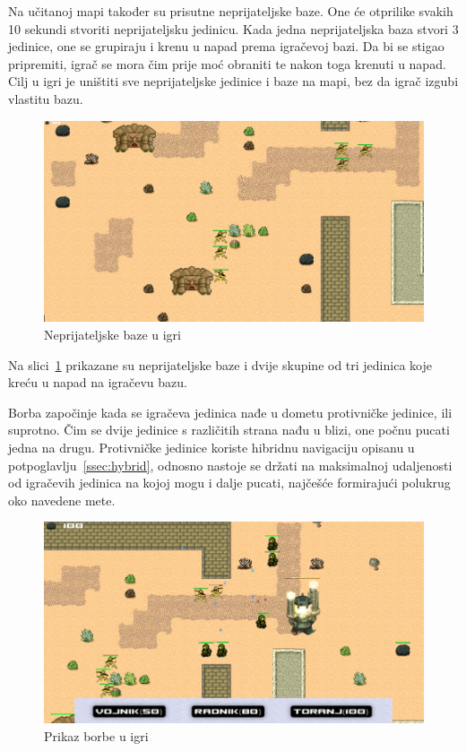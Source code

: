 \documentclass[times, utf8, zavrsni, numeric]{fer}
\begin{document}
\par Na učitanoj mapi također su prisutne neprijateljske baze.
One će otprilike svakih 10 sekundi stvoriti neprijateljsku jedinicu.
Kada jedna neprijateljska baza stvori 3 jedinice, one se grupiraju i krenu u napad prema igračevoj bazi.
Da bi se stigao pripremiti, igrač se mora čim prije moć obraniti te nakon toga krenuti u napad.
Cilj u igri je uništiti sve neprijateljske jedinice i baze na mapi, bez da igrač izgubi vlastitu bazu. 

\begin{figure}[h]
	\centering
	\includegraphics[width=0.9\linewidth]{images/enemyBases.png}
	\caption{Neprijateljske baze u igri}
	\label{fig:enemyBases}
\end{figure}

\par Na slici~\ref{fig:enemyBases} prikazane su neprijateljske baze i dvije skupine od tri jedinica koje kreću u napad na igračevu bazu.

\par Borba započinje kada se igračeva jedinica nađe u dometu protivničke jedinice, ili suprotno.
Čim se dvije jedinice s različitih strana nađu u blizi, one počnu pucati jedna na drugu.
Protivničke jedinice koriste hibridnu navigaciju opisanu u potpoglavlju~\ref{ssec:hybrid}, odnosno nastoje se držati na maksimalnoj udaljenosti od igračevih jedinica na kojoj mogu i dalje pucati, najčešće formirajući polukrug oko navedene mete.

\begin{figure}[h]
	\centering
	\includegraphics[width=0.9\linewidth]{images/battle.png}
	\caption{Prikaz borbe u igri}
	\label{fig:battle}
\end{figure}
\end{document}
